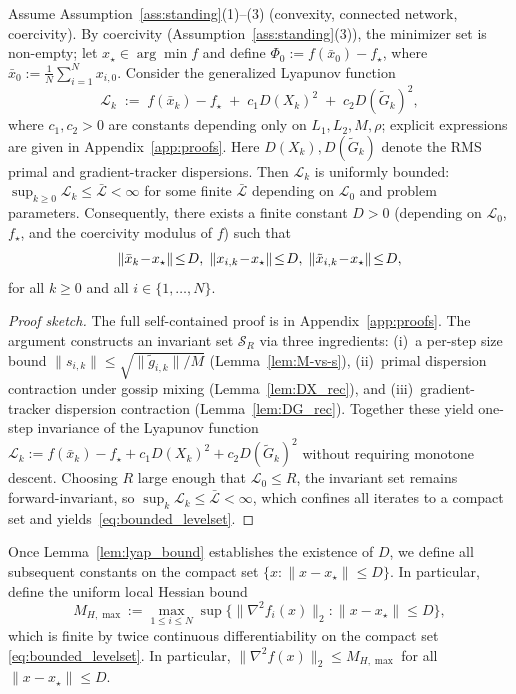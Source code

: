 \documentclass[review,onefignum,onetabnum]{siamart171218}
\begin{document}
	\begin{lemma}\label{lem:lyap_bound}
		Assume Assumption~\ref{ass:standing}(1)--(3) (convexity, connected network, coercivity).
		By coercivity (Assumption~\ref{ass:standing}(3)), the minimizer set is non-empty;
		let $x_\star\in\arg\min f$ and define
		$\Phi_0:=f(\bar x_0)-f_\star$, where $\bar x_0:=\frac1N\sum_{i=1}^N x_{i,0}$.
		Consider the generalized Lyapunov function
		\[
		\mathcal L_k \;:=\; f(\bar x_k)-f_\star \;+\; c_1 D(X_k)^2 \;+\; c_2 D(\tilde G_k)^2,
		\]
		where $c_1,c_2>0$ are constants depending only on $L_1,L_2,M,\rho$;
		explicit expressions are given in Appendix~\ref{app:proofs}. Here
		$D(X_k), D(\tilde G_k)$ denote the RMS primal and gradient-tracker dispersions.
		Then $\mathcal L_k$ is uniformly bounded: $\sup_{k\ge 0}\mathcal L_k \le \bar{\mathcal L} < \infty$ for some finite $\bar{\mathcal L}$ depending on $\mathcal L_0$ and problem parameters.
		Consequently, there exists a finite constant $D>0$
		(depending on $\mathcal L_0$, $f_\star$, and the coercivity modulus of $f$)
		such that
		\begin{equation}\label{eq:bounded_levelset}
			\norm{\bar x_k\!-\!x_\star}\!\le\! D,\;
			\norm{x_{i,k}\!-\!x_\star}\!\le\! D,\;
			\norm{\tilde x_{i,k}\!-\!x_\star}\!\le\! D,
		\end{equation}
		for all $k\ge 0$ and all $i\in\{1,\dots,N\}$.
	\end{lemma}

	\begin{proof}[Proof sketch]
	The full self-contained proof is in Appendix~\ref{app:proofs}.
	The argument constructs an invariant set
	$\mathcal S_R$ via three ingredients:
	(i)~a per-step size bound $\|s_{i,k}\|\le\sqrt{\|\tilde g_{i,k}\|/M}$
	(Lemma~\ref{lem:M-vs-s}),
	(ii)~primal dispersion contraction under gossip mixing
	(Lemma~\ref{lem:DX_rec}), and
	(iii)~gradient-tracker dispersion contraction
	(Lemma~\ref{lem:DG_rec}).
	Together these yield one-step invariance of the Lyapunov function
	$\mathcal L_k:=f(\bar x_k)-f_\star+c_1 D(X_k)^2+c_2 D(\tilde G_k)^2$
	without requiring monotone descent.
	Choosing $R$ large enough that $\mathcal L_0\le R$, the
	invariant set remains forward-invariant, so
	$\sup_k\mathcal L_k\le\bar{\mathcal L}<\infty$,
	which confines all iterates to a compact set and
	yields~\eqref{eq:bounded_levelset}.
	\end{proof}

	Once Lemma~\ref{lem:lyap_bound} establishes the existence of $D$,
	we define all subsequent constants on the compact set $\{x:\|x-x_\star\|\le D\}$.
	In particular, define the uniform local Hessian bound
	\begin{equation}\label{eq:MHmax_def}
		M_{H,\max}\!:=\!\max_{1\le i\le N}\sup\{\|\nabla^2 f_i(x)\|_2:\|x\!-\!x_\star\|\!\le\! D\},
	\end{equation}
	which is finite by twice continuous differentiability on the compact set \eqref{eq:bounded_levelset}.
	In particular, $\|\nabla^2 f(x)\|_2\le M_{H,\max}$ for all $\|x-x_\star\|\le D$.
\end{document}
